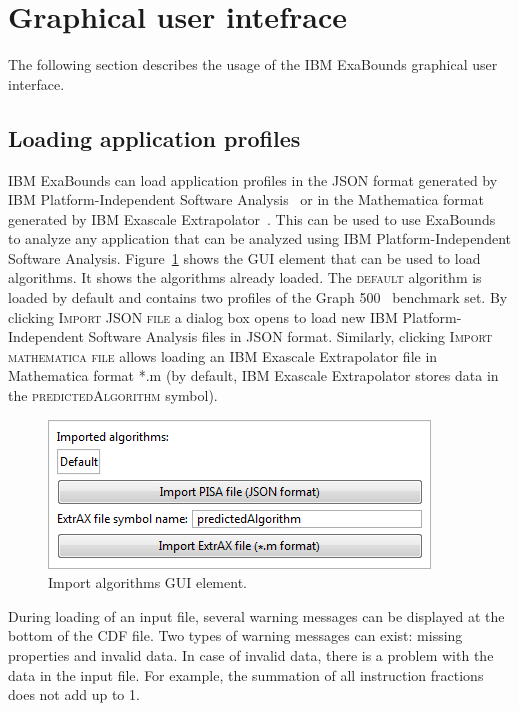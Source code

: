 \section{Graphical user intefrace}
\label{sec:200:gui}

The following section describes the usage of the IBM ExaBounds graphical user interface.

\subsection{Loading application profiles}

IBM ExaBounds can load application profiles in the JSON format generated by IBM Platform-Independent Software Analysis~\cite{Anghel2016} or in the Mathematica format generated by IBM Exascale Extrapolator~\cite{Mariani2016}. This can be used to use ExaBounds to analyze any application that can be analyzed using IBM Platform-Independent Software Analysis. Figure~\ref{fig:200:loadjson} shows the GUI element that can be used to load algorithms. It shows the algorithms already loaded. The \textsc{default} algorithm is loaded by default and contains two profiles of the Graph 500~\cite{Graph500} benchmark set. By clicking \textsc{Import JSON file} a dialog box opens to load new IBM Platform-Independent Software Analysis files in JSON format. Similarly, clicking \textsc{Import mathematica file} allows loading an IBM Exascale Extrapolator file in Mathematica format *.m (by default, IBM Exascale Extrapolator stores data in the \textsc{predictedAlgorithm} symbol).

\begin{figure}
  \centering
  \includegraphics[width=0.6\columnwidth]{img/load-json.png}
  \caption{Import algorithms GUI element.}
  \label{fig:200:loadjson}
\end{figure}

During loading of an input file, several warning messages can be displayed at the bottom of the CDF file. Two types of warning messages can exist: missing properties and invalid data. In case of invalid data, there is a problem with the data in the input file. For example, the summation of all instruction fractions does not add up to 1. %

